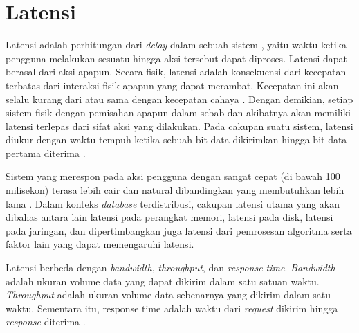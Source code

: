 \section{Latensi}
\label{sec:latensi}

Latensi adalah perhitungan dari \textit{delay} dalam sebuah sistem \parencite{goodwin2023latency}, yaitu waktu ketika pengguna melakukan sesuatu hingga aksi tersebut dapat diproses. Latensi dapat berasal dari aksi apapun. Secara fisik, latensi adalah konsekuensi dari kecepatan terbatas dari interaksi fisik apapun yang dapat merambat. Kecepatan ini akan selalu kurang dari atau sama dengan kecepatan cahaya \parencite{halliday2013fundamentals}. Dengan demikian, setiap sistem fisik dengan pemisahan apapun dalam sebab dan akibatnya akan memiliki latensi terlepas dari sifat aksi yang dilakukan. Pada cakupan suatu sistem, latensi diukur dengan waktu tempuh ketika sebuah bit data dikirimkan hingga bit data pertama diterima \parencite{johansson2000impact}.

Sistem yang merespon pada aksi pengguna dengan sangat cepat (di bawah 100 milisekon) terasa lebih cair dan natural dibandingkan yang membutuhkan lebih lama \parencite{dean2013tail}. Dalam konteks \textit{database} terdistribusi, cakupan latensi utama yang akan dibahas antara lain latensi pada perangkat memori, latensi pada disk, latensi pada jaringan, dan dipertimbangkan juga latensi dari pemrosesan algoritma serta faktor lain yang dapat memengaruhi latensi.

Latensi berbeda dengan \textit{bandwidth}, \textit{throughput}, dan \textit{response time}. \textit{Bandwidth} adalah ukuran volume data yang dapat dikirim dalam satu satuan waktu. \textit{Throughput} adalah ukuran volume data sebenarnya yang dikirim dalam satu waktu. Sementara itu, response time adalah waktu dari \textit{request} dikirim hingga \textit{response} diterima \parencite{goodwin2023latency}.




% 
